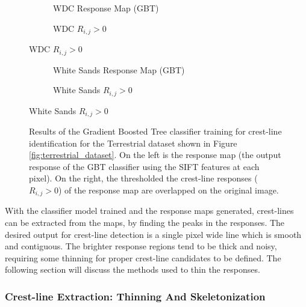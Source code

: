 \begin{figure}[H]
	\ContinuedFloat
	\centering
	\begin{subfigure}{0.48\textwidth}
		\centering
		\caption{WDC Response Map (GBT)}
		\label{fig:WDC_gbt_response}
	\end{subfigure}
	\begin{subfigure}{0.48\textwidth}
		\centering
		\caption{ WDC $R_{i,j} > 0$}
		\label{fig:WDC_gbt_response_overlay}
	\end{subfigure}
\end{figure}
\begin{figure}[H]
	\ContinuedFloat
	\centering
	\begin{subfigure}{0.48\textwidth}
		\centering
		\caption{White Sands Response Map (GBT)}
		\label{fig:WhiteSands_gbt_response}
	\end{subfigure}
	\begin{subfigure}{0.48\textwidth}
		\centering
		\caption{ White Sands $R_{i,j} > 0$}
		\label{fig:WhiteSands_gbt_response_overlay}
	\end{subfigure}
\end{figure}
\begin{figure}[H]
	\ContinuedFloat
	\centering
	\caption{Results of the Gradient Boosted Tree classifier training for crest-line identification for the Terrestrial dataset shown in Figure \ref{fig:terrestrial_dataset}. On the left is the response map (the output response of the GBT classifier using the SIFT features at each pixel). On the right, the thresholded the crest-line responses ($R_{i,j} > 0$) of the response map are overlapped on the original image. }
	\label{fig:gbt_response_results}
\end{figure}

With the classifier model trained and the response maps generated, crest-lines can be extracted from the maps, by finding the peaks in the responses. The desired output for crest-line detection is a single pixel wide line which is smooth and contiguous. The brighter response regions tend to be thick and noisy, requiring some thinning for proper crest-line candidates to be defined. The following section will discuss the methods used to thin the responses.

\subsubsection{Crest-line Extraction: Thinning And Skeletonization}

